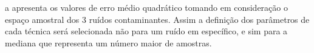 a  apresenta os valores de erro médio quadrático tomando em consideração o espaço amostral dos 3 ruídos contaminantes. Assim a definição dos parâmetros de cada técnica será selecionada não para um ruído em específico, e sim para a mediana que representa um número maior de amostras.



